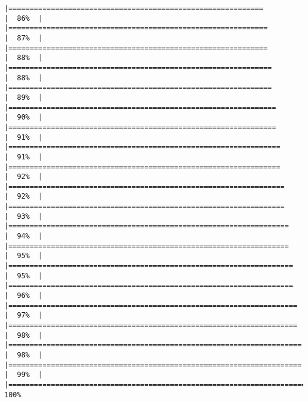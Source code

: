 \documentclass[
]{book}
\begin{document}
\begin{verbatim}
|============================================================          |  86%  |                                                                              |=============================================================         |  87%  |                                                                              |=============================================================         |  88%  |                                                                              |==============================================================        |  88%  |                                                                              |==============================================================        |  89%  |                                                                              |===============================================================       |  90%  |                                                                              |===============================================================       |  91%  |                                                                              |================================================================      |  91%  |                                                                              |================================================================      |  92%  |                                                                              |=================================================================     |  92%  |                                                                              |=================================================================     |  93%  |                                                                              |==================================================================    |  94%  |                                                                              |==================================================================    |  95%  |                                                                              |===================================================================   |  95%  |                                                                              |===================================================================   |  96%  |                                                                              |====================================================================  |  97%  |                                                                              |====================================================================  |  98%  |                                                                              |===================================================================== |  98%  |                                                                              |===================================================================== |  99%  |                                                                              |======================================================================| 100%
\end{verbatim}
\end{document}

